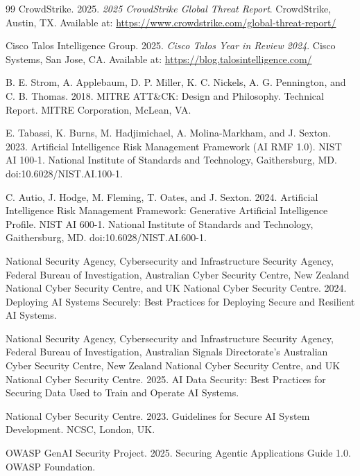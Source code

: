 \documentclass[unnumsec,webpdf,contemporary,large]{oup-authoring-template}
\theoremstyle{thmstyleone}
\theoremstyle{thmstyletwo}
\theoremstyle{thmstylethree}
\begin{document}
\begin{thebibliography}{99}
CrowdStrike. 2025. \textit{2025 CrowdStrike Global Threat Report}.
CrowdStrike, Austin, TX.
Available at: \url{https://www.crowdstrike.com/global-threat-report/}

Cisco Talos Intelligence Group. 2025. \textit{Cisco Talos Year in Review 2024}.
Cisco Systems, San Jose, CA.
Available at: \url{https://blog.talosintelligence.com/}

B. E. Strom, A. Applebaum, D. P. Miller, K. C. Nickels, A. G. Pennington, and
C. B. Thomas. 2018. MITRE ATT\&CK: Design and Philosophy. Technical Report.
MITRE Corporation, McLean, VA.

E. Tabassi, K. Burns, M. Hadjimichael, A. Molina-Markham, and J. Sexton. 2023.
Artificial Intelligence Risk Management Framework (AI RMF 1.0). NIST AI 100-1.
National Institute of Standards and Technology, Gaithersburg, MD.
doi:10.6028/NIST.AI.100-1.

C. Autio, J. Hodge, M. Fleming, T. Oates, and J. Sexton. 2024. Artificial Intelligence
Risk Management Framework: Generative Artificial Intelligence Profile. NIST AI 600-1.
National Institute of Standards and Technology, Gaithersburg, MD.
doi:10.6028/NIST.AI.600-1.

National Security Agency, Cybersecurity and Infrastructure Security Agency, Federal
Bureau of Investigation, Australian Cyber Security Centre, New Zealand National Cyber
Security Centre, and UK National Cyber Security Centre. 2024. Deploying AI Systems
Securely: Best Practices for Deploying Secure and Resilient AI Systems.

National Security Agency, Cybersecurity and Infrastructure Security Agency, Federal
Bureau of Investigation, Australian Signals Directorate's Australian Cyber Security
Centre, New Zealand National Cyber Security Centre, and UK National Cyber Security
Centre. 2025. AI Data Security: Best Practices for Securing Data Used to Train and
Operate AI Systems.

National Cyber Security Centre. 2023. Guidelines for Secure AI System Development.
NCSC, London, UK.

OWASP GenAI Security Project. 2025. Securing Agentic Applications Guide 1.0.
OWASP Foundation.


\end{thebibliography}
\end{document}
